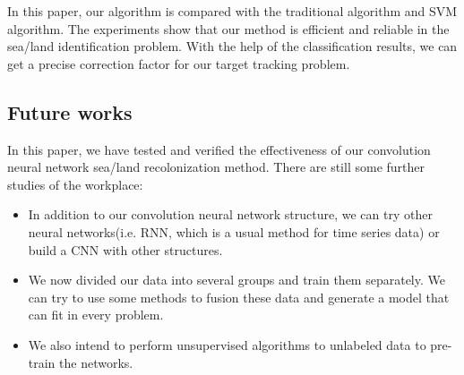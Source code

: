 In this paper, our algorithm is compared with the traditional algorithm and SVM algorithm. The experiments show that our method is efficient and reliable in the sea/land identification problem. With the help of the classification results, we can get a precise correction factor for our target tracking problem.

\subsection{Future works}
In this paper, we have tested and verified the effectiveness of our convolution neural network sea/land recolonization method. There are still some further studies of the workplace:

\begin{itemize}
	\item In addition to our convolution neural network structure, we can try other neural networks(i.e. RNN, which is a usual method for time series data) or build a CNN with other structures.
	\item We now divided our data into several groups and train them separately. We can try to use some methods to fusion these data and generate a model that can fit in every problem.
	\item We also intend to perform unsupervised algorithms to unlabeled data to pre-train the networks.
\end{itemize}